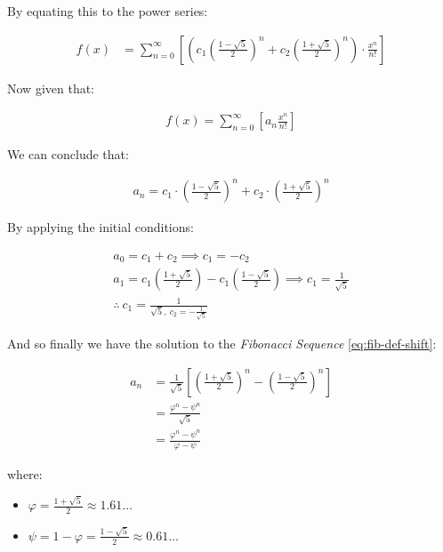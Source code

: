 \documentclass[11pt]{article}
\begin{document}
By equating this to the power series:


\begin{align*}
f\left( x \right)&= \sum^{\infty}_{n= 0}   \left[ \left( c_1\left( \frac{1- \sqrt{5} }{2} \right)^n +  c_2  \left( \frac{1+ \sqrt{5} }{2} \right)^n \right) \cdot  \frac{x^n}{n!} \right]
\end{align*}


Now given that:


\begin{align*}
f\left( x \right)= \sum^{\infty}_{n= 0}   \left[ a_n \frac{x^n}{n!} \right]
\end{align*}


We can conclude that:


\begin{align*}
a_n = c_1\cdot  \left( \frac{1- \sqrt{5} }{2} \right)^n +  c_2 \cdot  \left( \frac{1+  \sqrt{5} }{2} \right)^n
\end{align*}


By applying the initial conditions:


\begin{align*}
a_0= c_1 +  c_2  \implies  c_1= - c_2\\
a_1= c_1 \left( \frac{1+ \sqrt{5} }{2} \right) -  c_1 \left( \frac{1-\sqrt{5} }{2} \right)  \implies  c_1 = \frac{1}{\sqrt{5} }\\
\therefore ~ c_1 = \frac{1}{\sqrt{5}, ~ c_2 = -\frac{1}{\sqrt{5}}}
\end{align*}


And so finally we have the solution to the \emph{Fibonacci Sequence} \ref{eq:fib-def-shift}:


\begin{align}
    a_n &= \frac{1}{\sqrt{5} } \left[ \left( \frac{1+  \sqrt{5} }{2}  \right)^n -  \left( \frac{1- \sqrt{5} }{2} \right)^n \right] \nonumber \\
&= \frac{\varphi^n - \psi^n}{\sqrt{5} } \nonumber\\
&=\frac{\varphi^n -  \psi^n}{\varphi - \psi} \label{eq:fib-sol}
\end{align}


where:

\begin{itemize}
\item \(\varphi = \frac{1+ \sqrt{5} }{2} \approx 1.61\ldots\)
\item \(\psi = 1-\varphi = \frac{1- \sqrt{5} }{2} \approx 0.61\ldots\)
\end{itemize}
\end{document}
